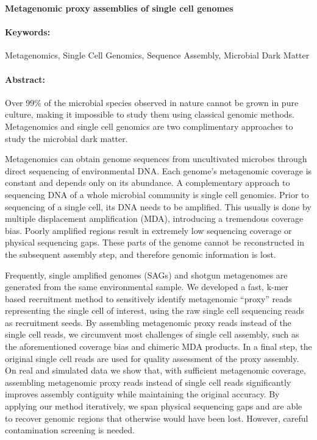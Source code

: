 \noindent
\large {\bf Metagenomic proxy assemblies of single cell genomes} 


\normalsize 


\noindent \paragraph{Keywords:} 
Metagenomics,
Single Cell Genomics,
Sequence Assembly,
Microbial Dark Matter

\noindent \paragraph{Abstract:} 

Over 99\% of the microbial species observed in nature cannot be grown in pure culture,
making it impossible to study them using classical genomic methods. Metagenomics
and single cell genomics are two complimentary approaches to study the microbial dark
matter.

Metagenomics can obtain genome sequences from uncultivated microbes through
direct sequencing of environmental DNA. Each genome’s metagenomic coverage is
constant and depends only on its abundance. A complementary approach to
sequencing DNA of a whole microbial community is single cell genomics. Prior to
sequencing of a single cell, its DNA needs to be amplified. This usually is done by
multiple displacement amplification (MDA), introducing a tremendous coverage bias.
Poorly amplified regions result in extremely low sequencing coverage or physical
sequencing gaps. These parts of the genome cannot be reconstructed in the
subsequent assembly step, and therefore genomic information is lost.

Frequently, single amplified genomes (SAGs) and shotgun metagenomes are generated
from the same environmental sample. We developed a fast, k-mer based recruitment
method to sensitively identify metagenomic “proxy” reads representing the single cell of
interest, using the raw single cell sequencing reads as recruitment seeds. By
assembling metagenomic proxy reads instead of the single cell reads, we circumvent
most challenges of single cell assembly, such as the aforementioned coverage bias and
chimeric MDA products. In a final step, the original single cell reads are used for quality
assessment of the proxy assembly.
On real and simulated data we show that, with sufficient metagenomic coverage,
assembling metagenomic proxy reads instead of single cell reads significantly improves
assembly contiguity while maintaining the original accuracy. By applying our method
iteratively, we span physical sequencing gaps and are able to recover genomic regions
that otherwise would have been lost. However, careful contamination screening is
needed.

